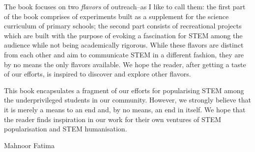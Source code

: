 The book focuses on two \textit{flavors} of outreach--as I like to call them: the first part of the book comprises of experiments built as a supplement for the science curriculum of primary schools; the second part consists of recreational projects which are built with the purpose of evoking a fascination for STEM among the audience while not being academically rigorous. While these flavors are distinct from each other and aim to communicate STEM in a different fashion, they are by no means the only flavors available. We hope the reader, after getting a taste of our efforts, is inspired to discover and explore other flavors.

This book encapsulates a fragment of our efforts for popularising STEM among the underprivileged students in our community. However, we strongly believe that it is merely a means to an end and, by no means, an end in itself. We hope that the reader finds inspiration in our work for their own ventures of STEM popularisation and STEM {humanisation}.

\vspace{2cm}
\begin{flushright}
{\large{Mahnoor Fatima}}
\end{flushright}